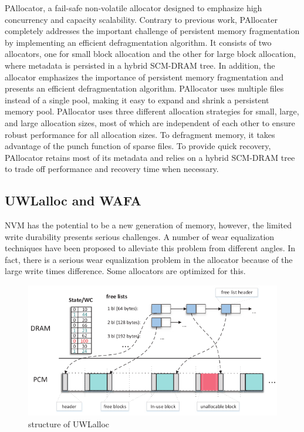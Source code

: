\documentclass[sigconf]{acmart}
\begin{document}
PAllocator, a fail-safe non-volatile allocator designed to emphasize high concurrency and capacity scalability. Contrary to previous work, PAllocater completely addresses the important challenge of persistent memory fragmentation by implementing an efficient defragmentation algorithm. It consists of two allocators, one for small block allocation and the other for large block allocation, where metadata is persisted in a hybrid SCM-DRAM tree. In addition, the allocator emphasizes the importance of persistent memory fragmentation and presents an efficient defragmentation algorithm. PAllocator uses multiple files instead of a single pool, making it easy to expand and shrink a persistent memory pool. PAllocator uses three different allocation strategies for small, large, and large allocation sizes, most of which are independent of each other to ensure robust performance for all allocation sizes. To defragment memory, it takes advantage of the punch function of sparse files. To provide quick recovery, PAllocator retains most of its metadata and relies on a hybrid SCM-DRAM tree to trade off performance and recovery time when necessary.
	
\subsection{UWLalloc and WAFA}

NVM has the potential to be a new generation of memory, however, the limited write durability presents serious challenges. A number of wear equalization techniques have been proposed to alleviate this problem from different angles. In fact, there is a serious wear equalization problem in the allocator because of the large write times difference. Some allocators are optimized for this.

\begin{figure}
	\centering
	\includegraphics[width=0.7\linewidth]{"figure 3"}
	\caption{structure of UWLalloc}
	\label{fig:figure-3}
\end{figure}
\end{document}

